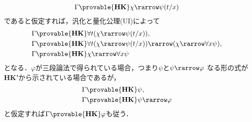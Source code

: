 \begin{metaprf}
\begin{description}
\begin{align}
				\Gamma \provable{\mbox{{\bf HK}}} \chi \rarrow \psi(t/x)
			\end{align}
			であると仮定すれば，汎化と量化公理(UI)によって
			\begin{align}
				\Gamma &\provable{\mbox{{\bf HK}}} \forall t(\chi \rarrow \psi(t/x)), \\
				\Gamma &\provable{\mbox{{\bf HK}}} \forall t(\chi \rarrow \psi(t/x))
					\rarrow (\chi \rarrow \forall x \psi), \\
				\Gamma &\provable{\mbox{{\bf HK}}} \chi \rarrow \forall x \psi
			\end{align}
			となる．$\varphi$が三段論法で得られている場合，つまり$\psi$と$\psi \rarrow \varphi$
			なる形の式が{\bf HK'}から示されている場合であるが，
			\begin{align}
				\Gamma &\provable{\mbox{{\bf HK}}} \psi, \\
				\Gamma &\provable{\mbox{{\bf HK}}} \psi \rarrow \varphi
			\end{align}
			と仮定すれば$\Gamma \provable{\mbox{{\bf HK}}} \varphi$も従う．
	

\end{description}
\end{metaprf}
